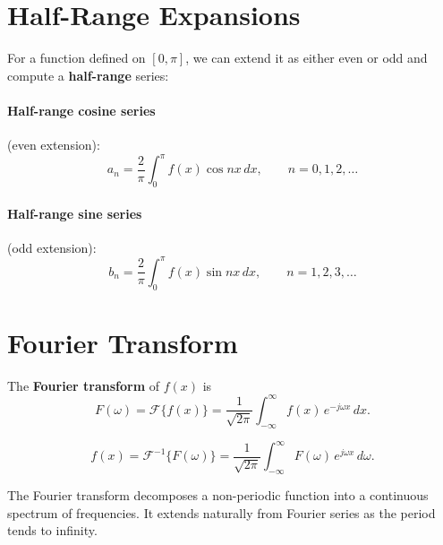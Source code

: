 \section{Half-Range Expansions}

For a function defined on $[0, \pi]$, we can extend it as either even or odd and
compute a \textbf{half-range} series:

\paragraph{Half-range cosine series} (even extension):
\[
  a_n = \frac{2}{\pi}\int_0^{\pi} f(x)\cos nx\,dx, \qquad n = 0, 1, 2, \ldots
\]

\paragraph{Half-range sine series} (odd extension):
\[
  b_n = \frac{2}{\pi}\int_0^{\pi} f(x)\sin nx\,dx, \qquad n = 1, 2, 3, \ldots
\]

\section{Fourier Transform}

\begin{definition}
The \textbf{Fourier transform} of $f(x)$ is
\[
  F(\omega) = \mathcal{F}\{f(x)\} = \frac{1}{\sqrt{2\pi}}\int_{-\infty}^{\infty} f(x)\,e^{-j\omega x}\,dx.
\]
\end{definition}

\begin{definition}
\[
  f(x) = \mathcal{F}^{-1}\{F(\omega)\} = \frac{1}{\sqrt{2\pi}}\int_{-\infty}^{\infty} F(\omega)\,e^{j\omega x}\,d\omega.
\]
\end{definition}

\begin{remark}
The Fourier transform decomposes a non-periodic function into a continuous spectrum
of frequencies. It extends naturally from Fourier series as the period tends to infinity.
\end{remark}
